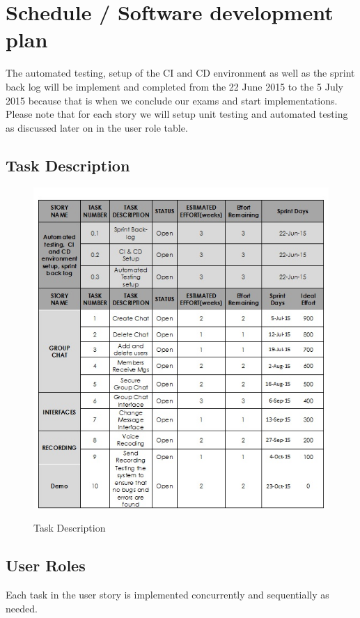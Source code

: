 \documentclass[a4paper]{article}
\begin{document}
\section{Schedule / Software development plan}
The automated testing, setup of the CI and CD environment as well as the sprint back log will be implement and completed from the 22 June 2015 to the 5 July 2015 because that is when we conclude our exams and start implementations.
Please note that for each story we will setup unit testing and automated testing as discussed later on in the user role table.

\subsection{Task Description}
\begin{figure}[H]
\includegraphics[width=1\linewidth]{./pictures/task.jpg}\\
\caption{\label{fig:Task Discription}Task Description}
\end{figure}

\subsection{User Roles}
Each task in the user story is implemented concurrently and sequentially as needed.
\end{document}
